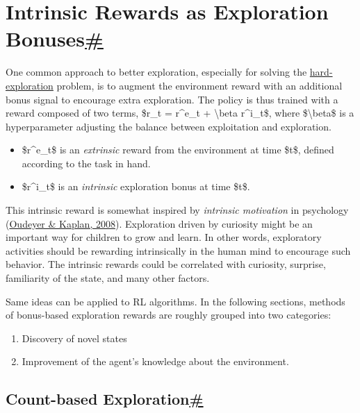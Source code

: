 \section{\texorpdfstring{Intrinsic Rewards as Exploration Bonuses\hyperref[intrinsic-rewards-as-exploration-bonuses]{\#}}{Intrinsic Rewards as Exploration Bonuses\#}}\label{intrinsic-rewards-as-exploration-bonuses}

One common approach to better exploration, especially for solving the \hyperref[the-hard-exploration-problem]{hard-exploration} problem, is to augment the environment reward with an additional bonus signal to encourage extra exploration. The policy is thus trained with a reward composed of two terms, \$r\_t = r\^{}e\_t + \textbackslash beta r\^{}i\_t\$, where \$\textbackslash beta\$ is a hyperparameter adjusting the balance between exploitation and exploration.

\begin{itemize}
\tightlist
\item
  \$r\^{}e\_t\$ is an \emph{extrinsic} reward from the environment at time \$t\$, defined according to the task in hand.
\item
  \$r\^{}i\_t\$ is an \emph{intrinsic} exploration bonus at time \$t\$.
\end{itemize}

This intrinsic reward is somewhat inspired by \emph{intrinsic motivation} in psychology (\href{https://www.researchgate.net/profile/Pierre-Yves_Oudeyer/publication/29614795_How_can_we_define_intrinsic_motivation/links/09e415107f1b4c8041000000/How-can-we-define-intrinsic-motivation.pdf}{Oudeyer \& Kaplan, 2008}). Exploration driven by curiosity might be an important way for children to grow and learn. In other words, exploratory activities should be rewarding intrinsically in the human mind to encourage such behavior. The intrinsic rewards could be correlated with curiosity, surprise, familiarity of the state, and many other factors.

Same ideas can be applied to RL algorithms. In the following sections, methods of bonus-based exploration rewards are roughly grouped into two categories:

\begin{enumerate}
\tightlist
\item
  Discovery of novel states
\item
  Improvement of the agent's knowledge about the environment.
\end{enumerate}

\subsection{\texorpdfstring{Count-based Exploration\hyperref[count-based-exploration]{\#}}{Count-based Exploration\#}}\label{count-based-exploration}

